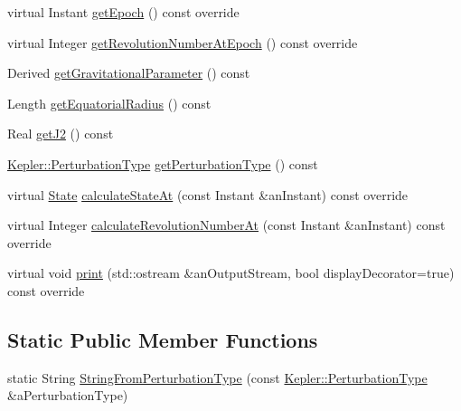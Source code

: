 \begin{DoxyCompactItemize}
\item 
virtual Instant \hyperlink{classostk_1_1astro_1_1trajectory_1_1orbit_1_1models_1_1_kepler_a01551fd006896966d4d5e4442c182f92}{get\+Epoch} () const override
\item 
virtual Integer \hyperlink{classostk_1_1astro_1_1trajectory_1_1orbit_1_1models_1_1_kepler_a2aa5b94462f65ea7e703d319d3e028b3}{get\+Revolution\+Number\+At\+Epoch} () const override
\item 
Derived \hyperlink{classostk_1_1astro_1_1trajectory_1_1orbit_1_1models_1_1_kepler_af7e879bf88e9a388c86d836ac50d6a97}{get\+Gravitational\+Parameter} () const
\item 
Length \hyperlink{classostk_1_1astro_1_1trajectory_1_1orbit_1_1models_1_1_kepler_abd9cabfcb1a39b627d2809d3cb11dad8}{get\+Equatorial\+Radius} () const
\item 
Real \hyperlink{classostk_1_1astro_1_1trajectory_1_1orbit_1_1models_1_1_kepler_aeff5940802c7795d9d709a0fdf15fa64}{get\+J2} () const
\item 
\hyperlink{classostk_1_1astro_1_1trajectory_1_1orbit_1_1models_1_1_kepler_a3750f9177ff06a1938826e2c2881d5a9}{Kepler\+::\+Perturbation\+Type} \hyperlink{classostk_1_1astro_1_1trajectory_1_1orbit_1_1models_1_1_kepler_a8f6d00fe11481e9267aded6f9aeafb1a}{get\+Perturbation\+Type} () const
\item 
virtual \hyperlink{classostk_1_1astro_1_1trajectory_1_1_state}{State} \hyperlink{classostk_1_1astro_1_1trajectory_1_1orbit_1_1models_1_1_kepler_a4de0c3d7a2b37c1c2ab4d6e207339809}{calculate\+State\+At} (const Instant \&an\+Instant) const override
\item 
virtual Integer \hyperlink{classostk_1_1astro_1_1trajectory_1_1orbit_1_1models_1_1_kepler_a312fe4296eadcb00799ce9981b0c4f18}{calculate\+Revolution\+Number\+At} (const Instant \&an\+Instant) const override
\item 
virtual void \hyperlink{classostk_1_1astro_1_1trajectory_1_1orbit_1_1models_1_1_kepler_a9c71803234f356ade03453e3ae19ae94}{print} (std\+::ostream \&an\+Output\+Stream, bool display\+Decorator=true) const override
\end{DoxyCompactItemize}
\subsection*{Static Public Member Functions}
\begin{DoxyCompactItemize}
\item 
static String \hyperlink{classostk_1_1astro_1_1trajectory_1_1orbit_1_1models_1_1_kepler_ad780ed9b53e355ebef1597f86d30cf84}{String\+From\+Perturbation\+Type} (const \hyperlink{classostk_1_1astro_1_1trajectory_1_1orbit_1_1models_1_1_kepler_a3750f9177ff06a1938826e2c2881d5a9}{Kepler\+::\+Perturbation\+Type} \&a\+Perturbation\+Type)
\end{DoxyCompactItemize}
